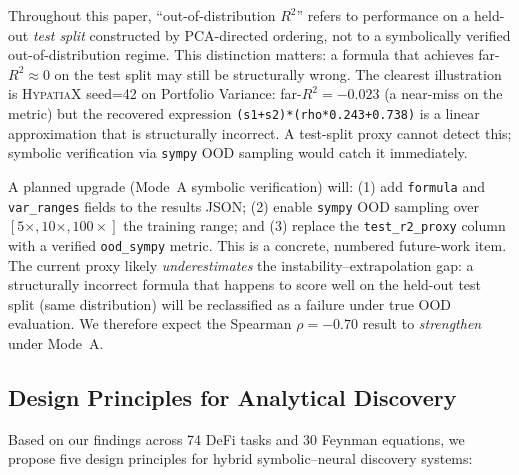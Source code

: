 \documentclass[twoside,11pt]{article}
\newcommand{\Rsq}{R^{2}}
\begin{document}
Throughout this paper, ``out-of-distribution $\Rsq$'' refers to performance on a
held-out \emph{test split} constructed by PCA-directed ordering, not to a
symbolically verified out-of-distribution regime.  This distinction matters: a
formula that achieves far-$\Rsq \approx 0$ on the test split may still be
structurally wrong.  The clearest illustration is \textsc{HypatiaX} seed=42 on
Portfolio Variance: far-$\Rsq = -0.023$ (a near-miss on the metric) but the
recovered expression \texttt{(s1+s2)*(rho*0.243+0.738)} is a linear approximation
that is structurally incorrect.  A test-split proxy cannot detect this; symbolic
verification via \texttt{sympy} OOD sampling would catch it immediately.

A planned upgrade (Mode~A symbolic verification) will: (1) add \texttt{formula} and
\texttt{var\_ranges} fields to the results JSON; (2) enable \texttt{sympy} OOD
sampling over $[5\times, 10\times, 100\times]$ the training range; and (3) replace
the \texttt{test\_r2\_proxy} column with a verified \texttt{ood\_sympy} metric.
This is a concrete, numbered future-work item.  The current proxy likely
\emph{underestimates} the instability--extrapolation gap: a structurally incorrect
formula that happens to score well on the held-out test split (same distribution)
will be reclassified as a failure under true OOD evaluation.  We therefore
expect the Spearman $\rho=-0.70$ result to \emph{strengthen} under Mode~A.

\subsection{Design Principles for Analytical Discovery}
\label{sec:disc_principles}

Based on our findings across 74 DeFi tasks and 30 Feynman equations, we propose five design principles for hybrid symbolic--neural discovery systems:
\end{document}
